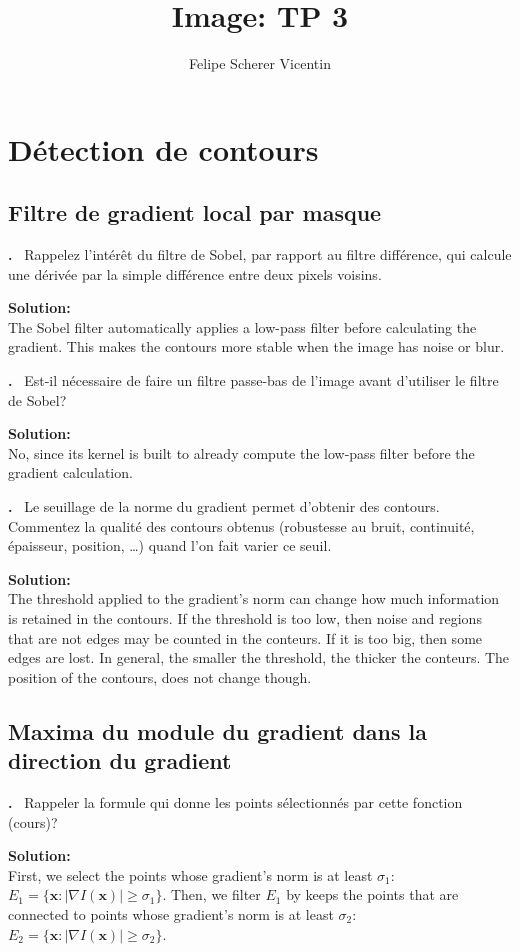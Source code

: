 \documentclass{article}
\title{Image: TP 3}
\author{Felipe Scherer Vicentin}
\newcounter{problem}
\newcounter{solution}
\newcommand\Problem{%
  \stepcounter{problem}%
  \textbf{\theproblem.}~%
  \setcounter{solution}{0}%
}
\newcommand\Solution{%
  \textbf{Solution:}\\%
}
\begin{document}
\maketitle

\section{Détection de contours}
\subsection{Filtre de gradient local par masque}

\Problem{Rappelez l'intérêt du filtre de Sobel, par rapport au filtre différence, qui calcule une dérivée par la simple différence entre deux pixels voisins.}

\Solution{The Sobel filter automatically applies a low-pass filter before calculating the gradient. This makes the contours more stable when the image has noise or blur.}

\Problem{Est-il nécessaire de faire un filtre passe-bas de l’image avant d’utiliser le filtre de Sobel?}

\Solution{No, since its kernel is built to already compute the low-pass filter before the gradient calculation.}

\Problem{Le seuillage de la norme du gradient permet d'obtenir des contours.
Commentez la qualité des contours obtenus (robustesse au bruit, continuité, épaisseur, position, \ldots) quand l'on fait varier ce seuil.}

\Solution{The threshold applied to the gradient's norm can change how much information is retained in the contours.
If the threshold is too low, then noise and regions that are not edges may be counted in the conteurs.
If it is too big, then some edges are lost.
In general, the smaller the threshold, the thicker the conteurs.
The position of the contours, does not change though.}

\subsection{Maxima du module du gradient dans la direction du gradient}

\Problem{Rappeler la formule qui donne les points sélectionnés par cette fonction (cours)?}

\Solution{First, we select the points whose gradient's norm is at least $\sigma_1$:
$E_1 = \{\mathbf{x} \colon \vert \nabla I(\mathbf{x}) \vert \geq \sigma_1 \}$.
Then, we filter $E_1$ by keeps the points that are connected to points whose gradient's norm is at least $\sigma_2$:
$E_2 = \{\mathbf{x} \colon \vert \nabla I(\mathbf{x}) \vert \geq \sigma_2 \}$.}
\end{document}
